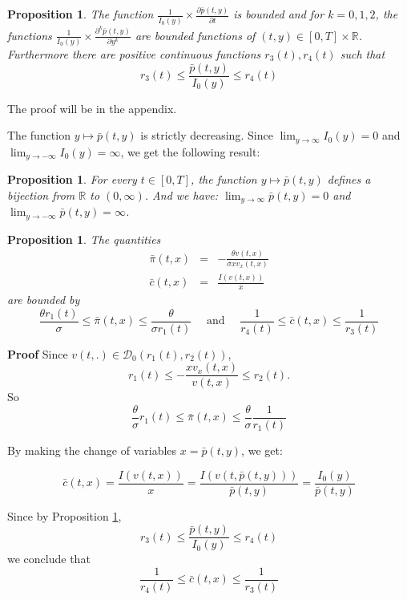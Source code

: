 \documentclass[11pt, psfig]{article}
\newtheorem{proposition}[theorem]{Proposition}
\theoremstyle{definition}
\theoremstyle{remark}
\numberwithin{equation}{section}
\def\sR{\mathbb{R}}
\def\sR{\mathbb{R}}
\newcommand{\be}{\begin{equation}}
\newcommand{\ee}{\end{equation}}
\def \proof{{\noindent \bf Proof}\quad}
\begin{document}
\begin{proposition}\label{bounds_barp}
The function $\frac{1}{I_0(y)}\times\frac{\partial \bar{p}(t,y)}{\partial t}$ is bounded and for $k=0, 1, 2$, the functions $\frac{1}{I_0(y)} \times \frac{\partial^k \bar{p}(t,y)}{\partial y^k}$ are bounded functions of $(t,y)\in [0,T]\times \sR$. Furthermore there are positive continuous functions $r_3(t), r_4(t)$ such that 
\be \label{ineq_barp_over_J}
r_3(t) \leq \frac{\bar{p}(t,y)}{I_{0}(y)} \leq r_4(t)
\ee
\end{proposition}

The proof will be in the appendix.

The function $y\mapsto \bar{p}(t,y)$ is strictly decreasing. Since $\lim_{y\rightarrow \infty} I_0(y) =0$ and $\lim_{y\rightarrow -\infty} I_0(y) =\infty$, we get the following result:
\begin{proposition}
For every $t\in [0,T]$, the function $y\mapsto \bar{p}(t,y)$ defines a bijection from $\sR$ to $(0,\infty)$. And we have: 
$\lim_{y\rightarrow \infty} \bar{p}(t,y) =0$ and $\lim_{y\rightarrow -\infty} \bar{p}(t,y) =\infty$.
\end{proposition}


\begin{proposition}\label{bounds_candpi}
The quantities \begin{eqnarray*}
 \bar{\pi}(t,x)&=&-\frac{\theta v(t,x)}{\sigma x v_{x}(t,x)} \\
\bar{c}(t,x)&=&\frac{I(v(t,x))}{x}
\end{eqnarray*}
are bounded by 
 \begin{equation}\label{bounds_pi_c}
 \frac{\theta r_1(t)}{\sigma} \leq \bar{\pi}(t,x)\leq \frac{\theta}{\sigma r_1(t)}\quad  \textrm{  and }\quad \frac{1}{r_4(t)}\leq \bar{c}(t,x) \leq \frac{1}{r_3(t)}
 \end{equation}
\end{proposition}
\proof
Since $v(t, .) \in \mathcal{D}_0(r_1(t), r_2(t))$,  $$r_1(t) \leq -\frac{xv_x(t,x)}{v(t,x)} \leq r_2(t).$$ So $$\frac{\theta}{\sigma} r_1(t) \leq \bar{\pi}(t,x)\leq \frac{\theta}{\sigma}\frac{1}{r_1(t)} $$




By making the change of variables $x=\bar{p}(t,y)$, we get:


$$\bar{c}(t,x)=\frac{I(v(t,x))}{x}= \frac{I(v(t,\bar{p}(t,y)))}{\bar{p}(t,y)}=\frac{I_0(y)}{\bar{p}(t,y)}$$

Since by Proposition \ref{bounds_barp}, $$r_3(t)\leq \frac{\bar{p}(t,y)}{I_{0}(y)}\leq r_4(t)$$
 we conclude that
 $$
\frac{1}{r_4(t)}\leq \bar{c}(t,x) \leq \frac{1}{r_3(t)}
$$
\end{document}

